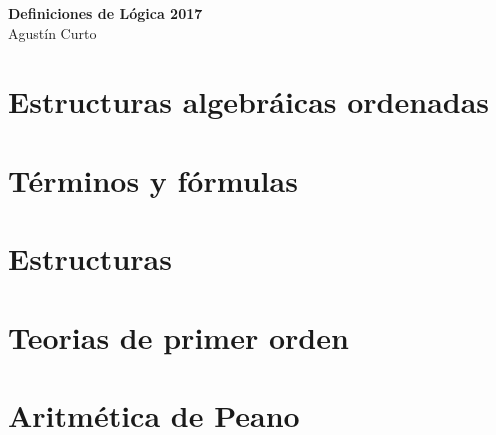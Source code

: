 \documentclass[12pt,a4paper]{article}
\begin{document}
	\begin{center}
		\Huge \textbf{Definiciones de Lógica 2017} \\
		\vspace{3mm}
		\large Agustín Curto
	\end{center}
	
	\part{Estructuras algebráicas ordenadas}
		
		
		
		
		
	
	\part{Términos y fórmulas}
		
		
	
	\part{Estructuras}
	
	\part{Teorias de primer orden}
	
	\part{Aritmética de Peano}
\end{document}
